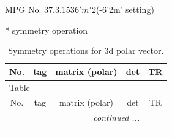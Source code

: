 \documentclass[fleqn,8pt]{jsarticle}
\begin{document}
\setcounter{MaxMatrixCols}{32}

\renewcommand{\tablename}{Table~}
\renewcommand{\figurename}{Figure~}
\begin{center}
\LARGE
MPG No. 37.3.153\quad$\bar{6}'m'2$\quad(-6'2m' setting)
\end{center}
* symmetry operation
\renewcommand{\arraystretch}{1.3}
\begin{longtable}{ccccc}
\caption{Symmetry operations for 3d polar vector.}
 \\
 \hline \hline
No. & tag & matrix (polar) & det & TR \\ \hline \endfirsthead

\multicolumn{4}{l}{\tablename\ \thetable{}} \\
 \hline \hline
No. & tag & matrix (polar) & det & TR \\ \hline \endhead

 \hline \hline
\multicolumn{4}{r}{\footnotesize\it continued ...} \\ \endfoot

 \hline \hline
\multicolumn{4}{r}{} \\ \endlastfoot


\end{longtable}
\end{document}
